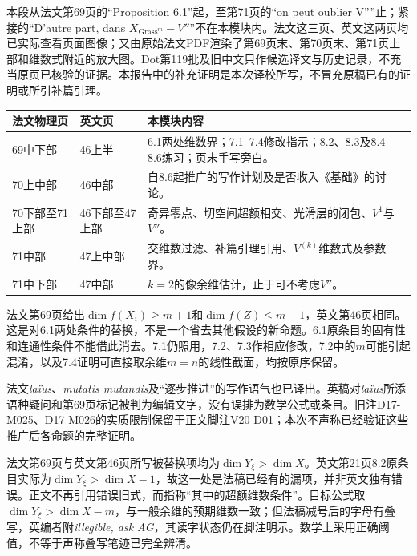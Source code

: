
本段从法文第69页的“Proposition 6.1”起，至第71页的“on peut oublier V''”止；紧接的“D'autre part, dans $X_{\mathrm{Grass}^{m}}-V''$”不在本模块内。法文这三页、英文这两页均已实际查看页面图像；又由原始法文PDF渲染了第69页末、第70页末、第71页上部和维数式附近的放大图。Dot第119批及旧中文只作候选译文与历史记录，不充当原页已核验的证据。本报告中的补充证明是本次译校所写，不冒充原稿已有的证明或所引补篇引理。

\begin{longtable}{p{}p{}p{}}
\toprule 法文物理页 & 英文页 & 本模块内容\\\midrule\endhead
69中下部 & 46上半 & 6.1两处维数界；7.1--7.4修改指示；8.2、8.3及8.4--8.6练习；页末手写旁白。\\
70上中部 & 46中部 & 自8.6起推广的写作计划及是否收入《基础》的讨论。\\
70下部至71上部 & 46下部至47上部 & 奇异零点、切空间超额相交、光滑层的闭包、$V^1$与$V''$。\\
71中部 & 47上中部 & 交维数过滤、补篇引理引用、$V^{(k)}$维数式及参数界。\\
71中下部 & 47中部 & $k=2$的像余维估计，止于可不考虑$V''$。\\
\bottomrule
\end{longtable}

法文第69页给出$\dim f(X_i)\geq m+1$和$\dim f(Z)\leq m-1$，英文第46页相同。这是对6.1两处条件的替换，不是一个省去其他假设的新命题。6.1原条目的固有性和连通性条件不能借此消去。7.1仍照用，7.2、7.3作相应修改，7.2中的$m$可能引起混淆，以及7.4证明可直接取余维$m=n$的线性截面，均按原序保留。

法文\emph{laïus}、\emph{mutatis mutandis}及“逐步推进”的写作语气也已译出。英稿对\emph{laïus}所添语种疑问和第69页标记被判为编辑文字，没有误排为数学公式或条目。旧注D17-M025、D17-M026的实质限制保留于正文脚注V20-D01；本次不声称已经验证这些推广后各命题的完整证明。

法文第69页与英文第46页所写被替换项均为$\dim Y_\xi>\dim X$。英文第21页8.2原条目实际为$\dim Y_\xi>\dim X-1$，故这一处是法稿已经有的漏项，并非英文独有错误。正文不再引用错误旧式，而指称“其中的超额维数条件”。目标公式取$\dim Y_\xi>\dim X-m$，与一般余维的预期维数一致；但法稿减号后的字母有叠写，英编者附\emph{illegible, ask AG}，其读字状态仍在脚注明示。数学上采用正确阈值，不等于声称叠写笔迹已完全辨清。

